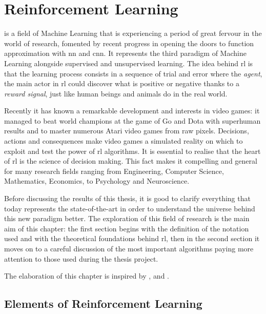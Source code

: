 \chapter{Reinforcement Learning}

 is a field of Machine Learning that is experiencing a period of great fervour in the world of research, fomented by recent progress in  opening the doors to function approximation with \gls{nn} and \gls{cnn}. It represents the third paradigm of Machine Learning alongside supervised and unsupervised learning. The idea behind \gls{rl} is that the learning process consists in a sequence of trial and error where the \textit{agent}, the main actor in \gls{rl} could discover what is positive or negative thanks to a \textit{reward signal}, just like human beings and animals do in the real world. 

Recently it has known a remarkable development and interests in video games: it managed to beat world champions at the game of Go \cite{silver2016mastering} and Dota with superhuman results and to master numerous Atari video games \cite{mnih2013playing} from raw pixels. Decisions, actions and consequences make video games a simulated reality on which to exploit and test the power of \gls{rl} algorithms.
It is essential to realise that the heart of \gls{rl} is the science of decision making. This fact makes it compelling and general for many research fields ranging from Engineering, Computer Science, Mathematics, Economics, to Psychology and Neuroscience.

Before discussing the results of this thesis, it is good to clarify everything that today represents the state-of-the-art in order to understand the universe behind this new paradigm better.
The exploration of this field of research is the main aim of this chapter: the first section begins with the definition of the notation used and with the theoretical foundations behind \gls{rl}, then in the second section it moves on to a careful discussion of the most important algorithms paying more attention to those used during the thesis project.

The elaboration of this chapter is inspired by \cite{silver2015lectures}, \cite{sutton2018reinforcement} and \cite{openai2018spinningup}.

\section{Elements of Reinforcement Learning}

